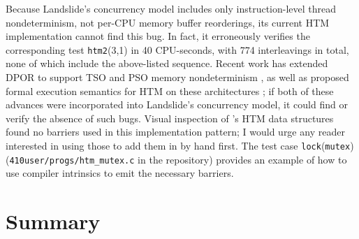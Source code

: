 Because Landslide's concurrency model includes only instruction-level thread nondeterminism,
not per-CPU memory buffer reorderings,
its current HTM implementation cannot find this bug.
In fact, it erroneously verifies the corresponding test {\tt htm2}(3,1)
in 40 CPU-seconds,
with 774 interleavings in total,
none of which include the above-listed sequence.
Recent work has extended DPOR to support TSO and PSO memory nondeterminism \cite{tsopso},
as well as proposed formal execution semantics for HTM on these architectures
\cite{relaxed-transactions-popl,relaxed-transactions-pldi};
if both of these advances were incorporated into Landslide's concurrency model,
it could find or verify the absence of such bugs.
Visual inspection of \cite{tm-benchmark-cmu}'s HTM data structures found no barriers used in this implementation pattern;
I would urge any reader interested in using those to add them in by hand first.
The test case {\tt lock}({\tt mutex}) ({\tt 410user/progs/htm\_mutex.c} in the repository)
provides an example of how to use compiler intrinsics to emit the necessary barriers.


\section{Summary}

